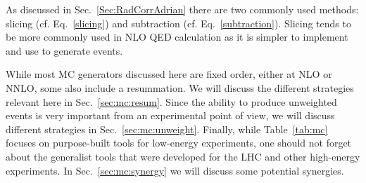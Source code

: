 As discussed in Sec.~\ref{Sec:RadCorrAdrian} there are two commonly used methods: slicing (cf. Eq.~\ref{slicing}) and subtraction (cf. Eq.~\ref{subtraction}).
Slicing tends to be more commonly used in NLO QED calculation as it is simpler to implement and use to generate events.

While most MC generators discussed here are fixed order, either at NLO or NNLO, some also include a resummation.
We will discuss the different strategies relevant here in Sec.~\ref{sec:mc:resum}.
Since the ability to produce unweighted events is very important from an experimental point of view, we will discuss different strategies in Sec.~\ref{sec:mc:unweight}.
Finally, while Table~\ref{tab:mc} focuses on purpose-built tools for low-energy experiments, one should not forget about the generalist tools that were developed for the LHC and other high-energy experiments.
In Sec.~\ref{sec:mc:synergy} we will discuss some potential synergies.


